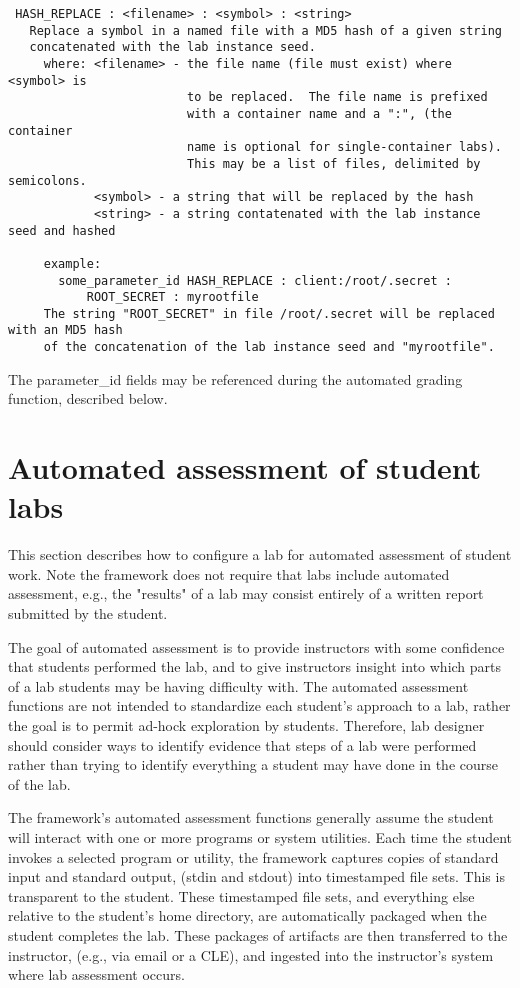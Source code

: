 \documentclass[12pt]{article}
\begin{document}
\begin{verbatim}
 HASH_REPLACE : <filename> : <symbol> : <string>
   Replace a symbol in a named file with a MD5 hash of a given string 
   concatenated with the lab instance seed.
     where: <filename> - the file name (file must exist) where <symbol> is 
                         to be replaced.  The file name is prefixed 
                         with a container name and a ":", (the container 
                         name is optional for single-container labs).  
                         This may be a list of files, delimited by semicolons. 
            <symbol> - a string that will be replaced by the hash
            <string> - a string contatenated with the lab instance seed and hashed

     example:
       some_parameter_id HASH_REPLACE : client:/root/.secret : 
           ROOT_SECRET : myrootfile
     The string "ROOT_SECRET" in file /root/.secret will be replaced with an MD5 hash
     of the concatenation of the lab instance seed and "myrootfile".
\end{verbatim}

The parameter\_id fields may be referenced during the automated grading function, described below. 


\section{Automated assessment of student labs}
This section describes how to configure a lab for automated assessment of student work.
Note the framework does not require that labs include automated assessment, e.g., the
"results" of a lab may consist entirely of a written report submitted by the student.

The goal of automated assessment is to provide instructors with some confidence that 
students performed the lab, and to give instructors insight into which parts
of a lab students may be having difficulty with.  The automated assessment functions are
not intended to standardize each student's approach to a lab, rather the goal is to permit
ad-hock exploration by students.  Therefore, lab designer should consider ways to identify
evidence that steps of a lab were performed rather than trying to identify everything a student
may have done in the course of the lab.

The framework's automated assessment functions generally assume the student will interact with one or
more programs or system utilities.  Each time the student invokes a selected program or utility, the 
framework captures copies of standard input and standard output, (stdin and stdout) into timestamped file sets.
This is transparent to the student.  These timestamped file sets, and everything else relative to
the student's home directory, are automatically packaged when the student completes the lab.
These packages of artifacts are then transferred to the instructor, (e.g., via email or a CLE), and 
ingested into the instructor's system where lab assessment occurs.
\end{document}
